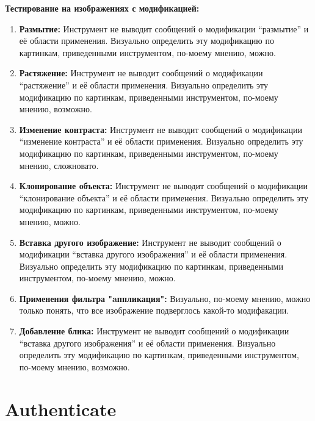 \textbf{Тестирование на изображениях с модификацией:}
\begin{enumerate}

\item \textbf{Размытие:}
Инструмент не выводит сообщений о модификации “размытие” и её области применения. Визуально определить эту модификацию по картинкам, приведенными инструментом, по-моему мнению, можно.

\item \textbf{Растяжение:}
Инструмент не выводит сообщений о модификации “растяжение” и её области применения. Визуально определить эту модификацию по картинкам, приведенными инструментом, по-моему мнению, возможно.

\item \textbf{Изменение контраста:}
Инструмент не выводит сообщений о модификации “изменение контраста” и её области применения. Визуально определить эту модификацию по картинкам, приведенными инструментом, по-моему мнению, сложновато.

\item \textbf{Клонирование объекта:}
Инструмент не выводит сообщений о модификации “клонирование объекта” и её области применения. Визуально определить эту модификацию по картинкам, приведенными инструментом, по-моему мнению, можно.

\item \textbf{Вставка другого изображение:}
Инструмент не выводит сообщений о модификации “вставка другого изображения” и её области применения. Визуально определить эту модификацию по картинкам, приведенными инструментом, по-моему мнению, можно.

\item \textbf{Применения фильтра "aппликация":}
Визуально, по-моему мнению, можно только понять, что все изображение подверглось какой-то модифакации. 

\item \textbf{Добавление блика:}
Инструмент не выводит сообщений о модификации “вставка другого изображения” и её области применения. Визуально определить эту модификацию по картинкам, приведенными инструментом, по-моему мнению, возможно.

\end{enumerate}

\newpage

\section{Authenticate}

